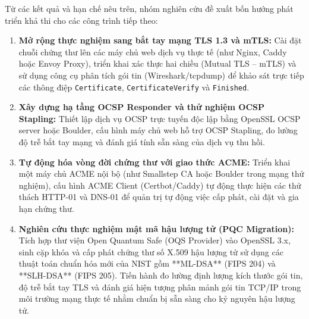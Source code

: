 Từ các kết quả và hạn chế nêu trên, nhóm nghiên cứu đề xuất bốn hướng phát triển khả thi cho các công trình tiếp theo:
\begin{enumerate}
    \item \textbf{Mở rộng thực nghiệm sang bắt tay mạng TLS 1.3 và mTLS:} Cài đặt chuỗi chứng thư lên các máy chủ web dịch vụ thực tế (như Nginx, Caddy hoặc Envoy Proxy), triển khai xác thực hai chiều (Mutual TLS -- mTLS) và sử dụng công cụ phân tích gói tin (Wireshark/tcpdump) để khảo sát trực tiếp các thông điệp \texttt{Certificate}, \texttt{CertificateVerify} và \texttt{Finished}.
    \item \textbf{Xây dựng hạ tầng OCSP Responder và thử nghiệm OCSP Stapling:} Thiết lập dịch vụ OCSP trực tuyến độc lập bằng OpenSSL OCSP server hoặc Boulder, cấu hình máy chủ web hỗ trợ OCSP Stapling, đo lường độ trễ bắt tay mạng và đánh giá tính sẵn sàng của dịch vụ thu hồi.
    \item \textbf{Tự động hóa vòng đời chứng thư với giao thức ACME:} Triển khai một máy chủ ACME nội bộ (như Smallstep CA hoặc Boulder trong mạng thử nghiệm), cấu hình ACME Client (Certbot/Caddy) tự động thực hiện các thử thách HTTP-01 và DNS-01 để quản trị tự động việc cấp phát, cài đặt và gia hạn chứng thư.
    \item \textbf{Nghiên cứu thực nghiệm mật mã hậu lượng tử (PQC Migration):} Tích hợp thư viện Open Quantum Safe (OQS Provider) vào OpenSSL 3.x, sinh cặp khóa và cấp phát chứng thư số X.509 hậu lượng tử sử dụng các thuật toán chuẩn hóa mới của NIST gồm **ML-DSA** (FIPS 204) và **SLH-DSA** (FIPS 205). Tiến hành đo lường định lượng kích thước gói tin, độ trễ bắt tay TLS và đánh giá hiện tượng phân mảnh gói tin TCP/IP trong môi trường mạng thực tế nhằm chuẩn bị sẵn sàng cho kỷ nguyên hậu lượng tử.
\end{enumerate}
